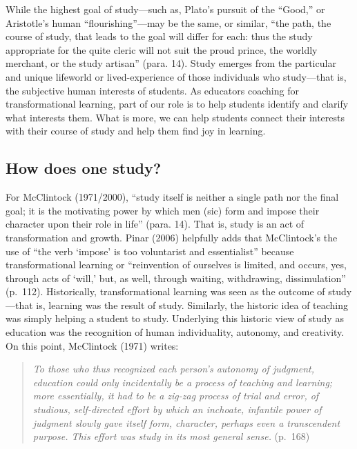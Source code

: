 \documentclass[
]{book}
\begin{document}
While the highest goal of study---such as, Plato's pursuit of the ``Good,'' or Aristotle's human ``flourishing''---may be the same, or similar, ``the path, the course of study, that leads to the goal will differ for each: thus the study appropriate for the quite cleric will not suit the proud prince, the worldly merchant, or the study artisan'' (para. 14). Study emerges from the particular and unique lifeworld or lived-experience of those individuals who study---that is, the subjective human interests of students. As educators coaching for transformational learning, part of our role is to help students identify and clarify what interests them. What is more, we can help students connect their interests with their course of study and help them find joy in learning.

\hypertarget{how-does-one-study}{%
\subsection*{How does one study?}\label{how-does-one-study}}

For McClintock (1971/2000), ``study itself is neither a single path nor the final goal; it is the motivating power by which men (sic) form and impose their character upon their role in life'' (para. 14). That is, study is an act of transformation and growth. Pinar (2006) helpfully adds that McClintock's the use of ``the verb `impose' is too voluntarist and essentialist'' because transformational learning or ``reinvention of ourselves is limited, and occurs, yes, through acts of `will,' but, as well, through waiting, withdrawing, dissimulation'' (p.~112). Historically, transformational learning was seen as the outcome of study---that is, learning was the result of study. Similarly, the historic idea of teaching was simply helping a student to study. Underlying this historic view of study as education was the recognition of human individuality, autonomy, and creativity. On this point, McClintock (1971) writes:

\begin{quote}
\emph{To those who thus recognized each person's autonomy of judgment, education could only incidentally be a process of teaching and learning; more essentially, it had to be a zig-zag process of trial and error, of studious, self-directed effort by which an inchoate, infantile power of judgment slowly gave itself form, character, perhaps even a transcendent purpose. This effort was study in its most general sense.} (p.~168)
\end{quote}
\end{document}
